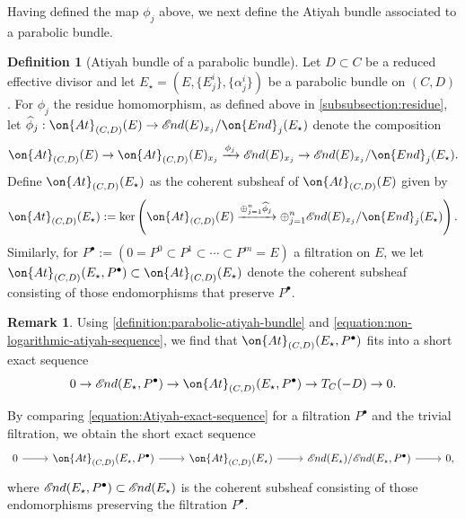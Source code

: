 \documentclass[12 pt]{amsart}
\theoremstyle{plain}
\theoremstyle{definition}
\newtheorem{definition}[subsubsection]{Definition}
\newtheorem{remark}[subsubsection]{Remark}
\theoremstyle{remark}
\numberwithin{equation}{section}
\newcommand*{\sheafend}{\mathscr{E}\kern -1pt nd}
\begin{document}
Having defined the map $\phi_j$ above, we next define the Atiyah bundle
associated to a parabolic bundle.
\begin{definition}[Atiyah bundle of a parabolic bundle]
	\label{definition:parabolic-atiyah-bundle}
Let $D\subset C$ be a reduced effective divisor 
and let $E_\star = (E, \{E^i_j\}, \{\alpha^i_j\})$ be a parabolic bundle on $(C,
D)$.
For $\phi_j$ the residue homomorphism, as defined above in
\autoref{subsubsection:residue},
let $\widehat{\phi}_j: \on{At}_{(C, D)}(E) \to \sheafend(E)_{x_j}/\on{End}_j(E_\star)$ denote the composition
\begin{align*}
	\on{At}_{(C, D)}(E) \to \on{At}_{(C,D)}(E)_{x_j} \xrightarrow{\phi_j}
	\sheafend(E)_{x_j} \to \sheafend(E)_{x_j}/\on{End}_j(E_\star).
\end{align*}
Define $\on{At}_{(C, D)}(E_\star)$ as the coherent subsheaf of $\on{At}_{(C, D)}(E)$ given by
\begin{align*}
	\on{At}_{(C,D)}(E_\star) := \ker\left( \on{At}_{(C,D)}(E)
	\xrightarrow{\oplus_{j=1}^n \widehat{\phi}_j } \oplus_{j=1}^n
\sheafend(E)_{x_j}/\on{End}_j(E_\star) \right).
\end{align*}
Similarly, for $P^\bullet := (0 = P^0 \subset P^1
\subset \cdots \subset P^m = E)$ a filtration on $E$,
we let 
$\on{At}_{(C,D)}(E_\star, P^\bullet) \subset \on{At}_{(C, D)}(E_\star)$
denote the coherent subsheaf
consisting of those endomorphisms that preserve $P^\bullet$. 
\end{definition}

\begin{remark}
	\label{remark:}
Using \autoref{definition:parabolic-atiyah-bundle}
	and \eqref{equation:non-logarithmic-atiyah-sequence},
	we find that $\on{At}_{(C,D)}(E_\star, P^\bullet)$ fits into a short exact sequence
\begin{equation}\label{equation:Atiyah-exact-sequence}
	0\to \sheafend(E_\star, P^\bullet)\to \on{At}_{(C,D)}(E_\star, P^\bullet)\to T_C(-D)\to
    0.
\end{equation}


By comparing \eqref{equation:Atiyah-exact-sequence} for a filtration $P^\bullet$
and the trivial filtration, we obtain 
the short exact sequence
\begin{equation}
	\label{equation:quotient-atiyah-bundles}
	\begin{tikzcd}
		0 \ar {r} &  \on{At}_{(C,D)}(E_\star, P^\bullet) \ar {r} &
		\on{At}_{(C,D)}(E_\star) \ar {r}
		& \sheafend(E_\star)/\sheafend(E_\star, P^\bullet)\ar {r} & 0,
\end{tikzcd}\end{equation}
where $\sheafend(E_\star, P^\bullet) \subset \sheafend(E_\star)$ is the coherent subsheaf
consisting of those endomorphisms preserving the filtration $P^\bullet$.
\end{remark}
\end{document}
